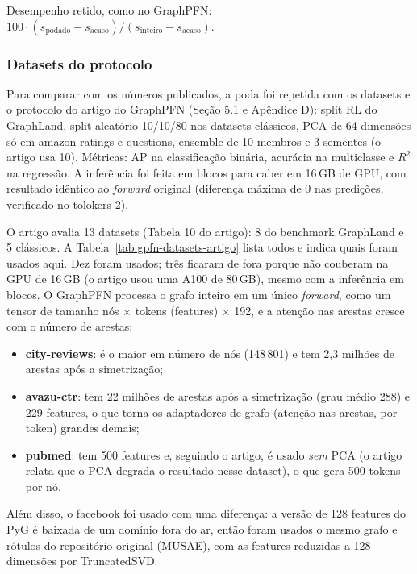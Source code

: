 \documentclass[12pt,a4paper]{article}
\begin{document}
Desempenho retido, como no GraphPFN: $100\cdot(s_{\text{podado}}-s_{\text{acaso}})/(s_{\text{inteiro}}-s_{\text{acaso}})$.

\subsubsection{Datasets do protocolo}

Para comparar com os números publicados, a poda foi repetida com os datasets e o protocolo do artigo do GraphPFN (Seção 5.1 e Apêndice D): split RL do GraphLand, split aleatório 10/10/80 nos datasets clássicos, PCA de 64 dimensões só em amazon-ratings e questions, ensemble de 10 membros e 3 sementes (o artigo usa 10). Métricas: AP na classificação binária, acurácia na multiclasse e $R^2$ na regressão. A inferência foi feita em blocos para caber em 16\,GB de GPU, com resultado idêntico ao \emph{forward} original (diferença máxima de $0$ nas predições, verificado no tolokers-2).

O artigo avalia 13 datasets (Tabela 10 do artigo): 8 do benchmark GraphLand e 5 clássicos. A Tabela~\ref{tab:gpfn-datasets-artigo} lista todos e indica quais foram usados aqui. Dez foram usados; três ficaram de fora porque não couberam na GPU de 16\,GB (o artigo usou uma A100 de 80\,GB), mesmo com a inferência em blocos. O GraphPFN processa o grafo inteiro em um único \emph{forward}, como um tensor de tamanho nós $\times$ tokens (features) $\times$ 192, e a atenção nas arestas cresce com o número de arestas:
\begin{itemize}
  \item \textbf{city-reviews}: é o maior em número de nós (148\,801) e tem 2,3 milhões de arestas após a simetrização;
  \item \textbf{avazu-ctr}: tem 22 milhões de arestas após a simetrização (grau médio 288) e 229 features, o que torna os adaptadores de grafo (atenção nas arestas, por token) grandes demais;
  \item \textbf{pubmed}: tem 500 features e, seguindo o artigo, é usado \emph{sem} PCA (o artigo relata que o PCA degrada o resultado nesse dataset), o que gera 500 tokens por nó.
\end{itemize}
Além disso, o facebook foi usado com uma diferença: a versão de 128 features do PyG é baixada de um domínio fora do ar, então foram usados o mesmo grafo e rótulos do repositório original (MUSAE), com as features reduzidas a 128 dimensões por TruncatedSVD.
\end{document}
